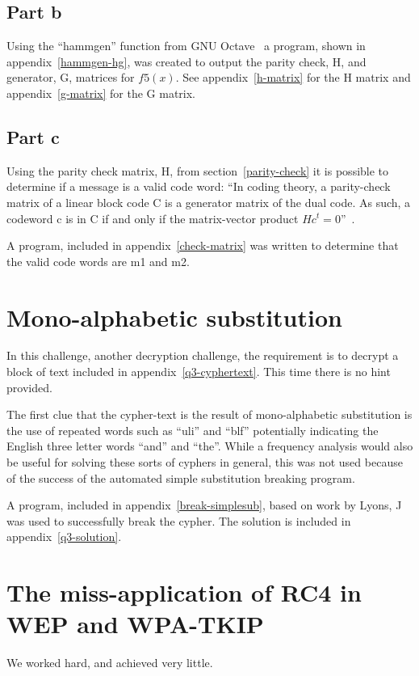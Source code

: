 \documentclass[pdftex, 12pt, a4paper]{article}
\begin{document}
\subsection{Part b}
Using the ``hammgen'' function from GNU Octave~\cite{hammgen-octave} a program, shown in appendix~\ref{hammgen-hg}, was created to output the parity check, H\label{parity-check}, and generator, G, matrices for $f5(x)$. See appendix~\ref{h-matrix} for the H matrix and appendix~\ref{g-matrix} for the G matrix.

\subsection{Part c}

Using the parity check matrix, H, from section~\ref{parity-check} it is possible to determine if a message is a valid code word: ``In coding theory, a parity-check matrix of a linear block code C is a generator matrix of the dual code. As such, a codeword c is in C if and only if the matrix-vector product $Hc^t = 0$''~\cite{check-matrix}.

A program, included in appendix~\ref{check-matrix} was written to determine that the valid code words are m1 and m2.

\section{Mono-alphabetic substitution}\label{mono}
In this challenge, another decryption challenge, the requirement is to decrypt a block of text included in appendix~\ref{q3-cyphertext}. This time there is no hint provided.

The first clue that the cypher-text is the result of mono-alphabetic substitution is the use of repeated words such as ``uli'' and ``blf'' potentially indicating the English three letter words ``and'' and ``the''. While a frequency analysis would also be useful for solving these sorts of cyphers in general, this was not used because of the success of the automated simple substitution breaking program.

A program, included in appendix~\ref{break-simplesub}, based on work by Lyons, J\cite{stochastic-searching} was used to successfully break the cypher. The solution is included in appendix~\ref{q3-solution}.

\section{The miss-application of RC4 in WEP and WPA-TKIP}\label{conclusions}
We worked hard, and achieved very little.
\end{document}
